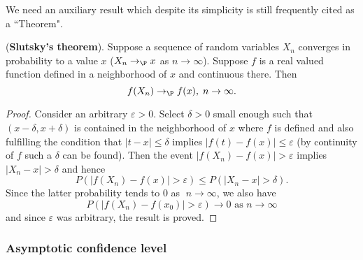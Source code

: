 We need an auxiliary result which despite its simplicity is still frequently
cited as a ``Theorem".

\begin{prop}
\label{theo-slutsky}(\textbf{Slutsky's theorem}). Suppose a sequence of
random variables $X_{n}$ converges in probability to a value $x$ ($%
X_{n}\rightarrow _{\P }x$ as $n\rightarrow \infty $). Suppose $f$ is a real
valued function defined in a neighborhood of $x$ and continuous there. Then 
\begin{equation*}
f(X_{n})\rightarrow _{\P }f(x),\;n\rightarrow \infty .
\end{equation*}
\end{prop}

\begin{proof}
Consider an arbitrary $\varepsilon >0$. Select $\delta >0$ small enough such
that $(x-\delta ,x+\delta )$ is contained in the neighborhood of $x$ where $%
f $ is defined and also fulfilling the condition that $\left\vert
t-x\right\vert \leq \delta $ implies $\left\vert f(t)-f(x)\right\vert \leq
\varepsilon $ (by continuity of $f$ such a $\delta $ can be found). Then the
event $\left\vert f(X_{n})-f(x)\right\vert >\varepsilon $ implies $%
\left\vert X_{n}-x\right\vert >\delta $ and hence 
\begin{equation*}
P\left( \left\vert f(X_{n})-f(x)\right\vert >\varepsilon \right) \leq
P\left( \left\vert X_{n}-x\right\vert >\delta \right) .
\end{equation*}%
Since the latter probability tends to $0$ as $\;n\rightarrow \infty $, we
also have 
\begin{equation*}
P\left( \left\vert f(X_{n})-f(x_{0})\right\vert >\varepsilon \right)
\rightarrow 0\text{ as }n\rightarrow \infty
\end{equation*}%
and since $\varepsilon $ was arbitrary, the result is proved.\bigskip
\end{proof}


\subsubsection{Asymptotic confidence level}


